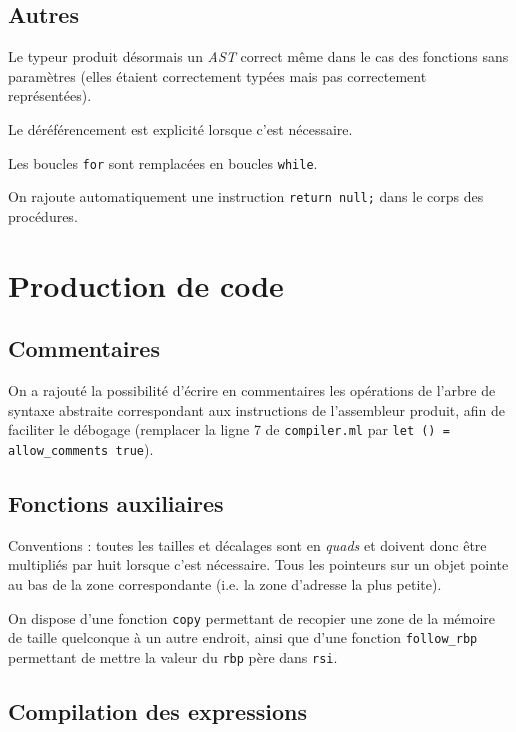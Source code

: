 \documentclass[a4paper, 10pt, french]{article}
\newcommand{\codeAda}[1]{\texttt{#1}}
\newcommand{\codeOCaml}[1]{\texttt{#1}}
\newcommand{\codeASM}[1]{\texttt{#1}}
\newcommand{\code}[1]{\texttt{#1}}
\newcommand{\foreign}{\emph}
\begin{document}
\subsection{Autres}

Le typeur produit désormais un \foreign{AST} correct même dans le cas des fonctions sans paramètres (elles étaient correctement typées mais pas correctement représentées).

Le déréférencement est explicité lorsque c'est nécessaire.

Les boucles \codeAda{for} sont remplacées en boucles \codeAda{while}.

On rajoute automatiquement une instruction \codeAda{return null;} dans le corps des procédures.


\clearpage
\section{Production de code}

\subsection{Commentaires}

On a rajouté la possibilité d'écrire en commentaires les opérations de l'arbre de syntaxe abstraite correspondant aux instructions de l'assembleur produit, afin de faciliter le débogage (remplacer la ligne 7 de \code{compiler.ml} par \codeOCaml{let () = allow_comments true}).

\subsection{Fonctions auxiliaires}

Conventions : toutes les tailles et décalages sont en \foreign{quads} et doivent donc être multipliés par huit lorsque c'est nécessaire. Tous les pointeurs sur un objet pointe au bas de la zone correspondante (i.e. la zone d'adresse la plus petite).

On dispose d'une fonction \codeOCaml{copy} permettant de recopier une zone de la mémoire de taille quelconque à un autre endroit, ainsi que d'une fonction \codeOCaml{follow_rbp} permettant de mettre la valeur du \codeASM{rbp} père dans \codeASM{rsi}.

\subsection{Compilation des expressions}
\end{document}
